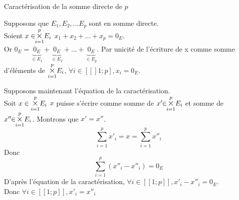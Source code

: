 \documentclass{article}
\begin{document}
	{Caractérisation de la somme directe de $p$ \sevs}

	Supposons que $E_1, E_2, \ldots E_p$ sont en somme directe. \\
	Soient $x \in \!\! \overset{p}{\underset{i=1}{\mathlarger{\mathlarger{\times}}}} E_i$ \fqs \tqs $x_1 + x_2 + \ldots + x_p = 0_E$. \\
	Or $0_E = \underbrace{0_E}_{\in E_1} + \underbrace{0_E}_{\in E_2} + \ldots + \underbrace{0_E}_{\in E_p}$.
	Par unicité de l'écriture de x comme somme d'éléments de $\overset{p}{\underset{i=1}{\mathlarger{\mathlarger{\times}}}} E_i$, $\forall i \in [\![]1;p\!], x_i = 0_E$.

	Supposons maintenant l'équation de la caractérisation. \\
	Soit $x \in \overset{p}{\underset{i=1}{\mathlarger{\mathlarger{\times}}}} E_i$ \tq $x$ puisse s'écrire comme somme de $x' \!\! \in \!\! \overset{p}{\underset{i=1}{\mathlarger{\mathlarger{\times}}}} E_i$ et somme de $x'' \!\! \in \!\! \overset{p}{\underset{i=1}{\mathlarger{\mathlarger{\times}}}} E_i$. Montrons que $x' = x''$.
	\begin{equation*}
		\sum_{i=1}^{p} x'_i = x = \sum_{i=1}^{p} x''_i
	\end{equation*}
	Donc
	\begin{equation*}
		\sum_{i=1}^{p} \left( x''_i -x''_i \right) = 0_E
	\end{equation*}
	D'après l'équation de la caractérisation, $\forall i \in [\![1;p]\!], x'_i - x''_i = 0_E$. \\
	Donc $\forall i \in [\![1;p]\!], x'_i = x''_i$
\end{question_kholle}
\end{document}

